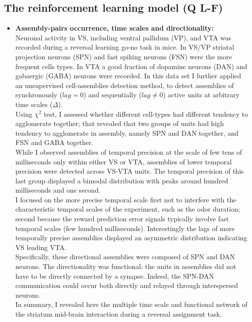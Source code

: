 \subsection{The reinforcement learning model (Q L-F)}


\begin{itemize}
    \item \textbf{Assembly-pairs occurrence, time scales and directionality:}\\Neuronal activity in VS, including ventral pallidum (VP), and VTA was recorded during a reversal learning go-no task in mice. In VS/VP striatal projection neurons (SPN) and fast spiking neurons (FSN) were the more frequent cells types. In VTA a good fraction of dopamine neurons (DAN) and  gabaergic (GABA) neurons were recorded. In this data set I further applied an unsupervised cell-assemblies detection method, to detect assemblies of synchronously ($lag=0$) and sequentially ($lag\neq0$) active units at arbitrary time scales ($\Delta$).\\Using $\chi^2$ test, I assessed whether different cell-types had different tendency to agglomerate together; that revealed that two groups of units had high tendency to agglomerate in assembly, namely SPN and DAN together, and FSN and GABA together.\\While I observed assemblies of temporal precision at the scale of few tens of milliseconds only within either VS or VTA, assemblies of lower temporal precision were detected across VS-VTA units. The temporal precision of this last group displayed a bimodal distribution with peaks around hundred milliseconds and one second.\\I focused on the more precise temporal scale first not to interfere with the characteristic temporal scales of the experiment, such as the odor duration; second because the reward prediction error signals typically involve fast temporal scales (few hundred milliseconds). Interestingly the lags of more temporally precise assemblies displayed an asymmetric distribution indicating VS leading VTA.\\ Specifically, these directional assemblies were composed of SPN and DAN neurons. The directionality was functional: the units in assemblies did not have to be directly connected by a synapse. Indeed, the SPN-DAN communication could occur both directly and relayed through interspersed neurons.\\In summary, I revealed here the multiple time scale and functional network of the striatum mid-brain interaction during a reversal assignment task.  

\end{itemize}

